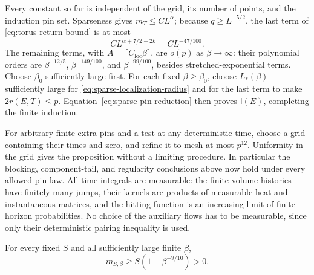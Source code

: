 Every constant so far is independent of the grid, its number of
points, and the induction pin set.  Sparseness gives
\(m_T\le C L^\alpha\); because \(q\ge L^{-5/2}\), the last term
of \eqref{eq:torus-return-bound} is at most
\[
 C L^{\alpha+7/2-2k}=C L^{-47/100}.
\]
The remaining terms, with \(A=\lceil C_{\mathrm{loc}}\beta\rceil\),
are \(o(p)\) as \(\beta\to\infty\): their polynomial orders are
\(\beta^{-12/5}\), \(\beta^{-149/100}\), and
\(\beta^{-99/100}\), besides stretched-exponential terms.
Choose \(\beta_0\) sufficiently large first.  For each fixed
\(\beta\ge\beta_0\), choose \(L_*(\beta)\) sufficiently large
for \eqref{eq:sparse-localization-radius} and for the last term to
make \(2r(E,T)\le p\).  Equation~\eqref{eq:sparse-pin-reduction}
then proves \(\mathsf I(E)\), completing the finite induction.

For arbitrary finite extra pins and a test at any deterministic time,
choose a grid containing their times and zero, and refine it to mesh
at most \(p^{12}\).  Uniformity in the grid gives the proposition
without a limiting procedure.  In particular the blocking,
component-tail, and regularity conclusions above now hold under every
allowed pin law.  All time integrals are measurable: the finite-volume
histories have finitely many jumps, their kernels are products of
measurable heat and instantaneous matrices, and the hitting function
is an increasing limit of finite-horizon probabilities.  No choice of
the auxiliary flows has to be measurable, since only their deterministic
pairing inequality is used.

\begin{corollary}\label{cor:positive-magnetization}
For every fixed \(S\) and all sufficiently large finite \(\beta\),
\[
 m_{S,\beta}\ge S(1-\beta^{-9/10})>0.
\]
\end{corollary}

